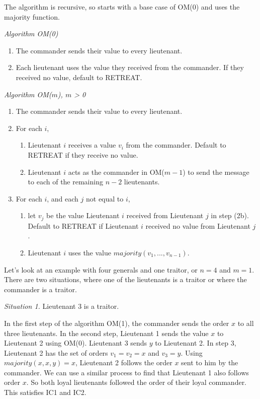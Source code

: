 \documentclass[10pt]{amsart}
\begin{document}
The algorithm is recursive, so starts with a base case of OM(0) and uses the majority function.

\noindent\emph{Algorithm OM(0)}
\vspace{-10pt}
\begin{enumerate}[label=\arabic{enumi}.]
    \item The commander sends their value to every lieutenant.
    \item {
        Each lieutenant uses the value they received from the commander. If they received no value, 
        default to RETREAT.
    }
\end{enumerate}

\noindent\emph{Algorithm OM($m$), $m$ > 0}
\vspace{-10pt}
\begin{enumerate}[label=\arabic{enumi}.]
    \item The commander sends their value to every lieutenant.
    \item For each $i$,
    \begin{enumerate}[label={\alph*.}]
        \item {
            Lieutenant $i$ receives a value $v_i$ from the commander. Default to RETREAT if they receive
            no value.
        }
        \item {
            Lieutenant $i$ acts as the commander in OM($m-1$) to send the message to each of the remaining
            $n-2$ lieutenants.
        }
    \end{enumerate}
    \item For each $i$, and each $j$ not equal to $i$,
    \begin{enumerate}[label={\alph*.}]
        \item {
            let $v_j$ be the value Lieutenant $i$ received from Lieutenant $j$ in step (2b). Default to 
            RETREAT if Lieutenant $i$ received no value from Lieutenant $j$.
        }
        \item Lieutenant $i$ uses the value $majority(v_1,...,v_{n-1})$.
    \end{enumerate}  
\end{enumerate}

Let's look at an example with four generals and one traitor, or $n=4$ and $m=1$. There are two
situations, where one of the lieutenants is a traitor or where the commander is a traitor.

\noindent \emph{Situation 1.} Lieutenant 3 is a traitor.

\begin{minipage}{.95\textwidth}%
    In the first step of the algorithm OM(1), the commander sends the order $x$ to all three lieutenants.
    In the second step, Lieutenant 1 sends the value $x$ to Lieutenant 2 using OM(0). Lieutenant 3 sends
    $y$ to Lieutenant 2. In step 3, Lieutenant 2 has the set of orders $v_1=v_2=x$ and $v_3=y$. Using
    $majority(x, x, y) = x$, Lieutenant 2 follows the order $x$ sent to him by the commander. We can use
    a similar process to find that Lieutenant 1 also follows order $x$. So both loyal lieutenants followed
    the order of their loyal commander. This satisfies IC1 and IC2.
\end{minipage}%
\end{document}
